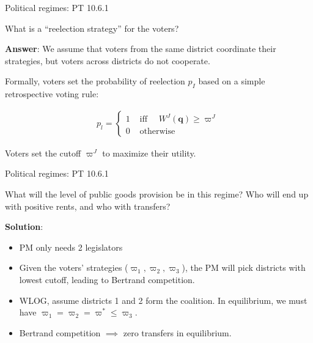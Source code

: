 \documentclass[11pt,aspectratio=169]{beamer}
\begin{document}
\begin{frame}{Political regimes: PT 10.6.1}

\begin{tcolorbox}
What is a ``reelection strategy'' for the voters?
\end{tcolorbox}

\pause

\textbf{Answer}: We assume that voters from the same district coordinate their strategies, but voters across districts do not cooperate.

\pause

Formally, voters set the probability of reelection $p_I$ based on a simple retrospective voting rule:

\begin{align*}
p_{l}=\left\{\begin{array}{ll}{1} & {\text { iff } \quad W^{J}(\mathbf{q}) \geq \varpi^{J} } \\ {0} & {\text { otherwise }}\end{array}\right.
\end{align*}

Voters set the cutoff $\varpi^J$ to maximize their utility.


\end{frame}
\begin{frame}{Political regimes: PT 10.6.1}

\begin{tcolorbox}
What will the level of public goods provision be in this regime?
Who will end up with positive rents, and who with transfers?
\end{tcolorbox}

\pause


\textbf{Solution}:

\begin{itemize}
\item PM only needs 2 legislators
\item Given the voters' strategies ($\varpi_1, \varpi_2, \varpi_3$), the PM will pick districts with lowest cutoff, leading to Bertrand competition.
\item WLOG, assume districts 1 and 2 form the coalition. In equilibrium, we must have $\varpi_1 = \varpi_2 = \varpi^* \leq \varpi_3$.
\item Bertrand competition $\implies$ zero transfers in equilibrium.

\end{itemize}


\end{frame}
\end{document}
